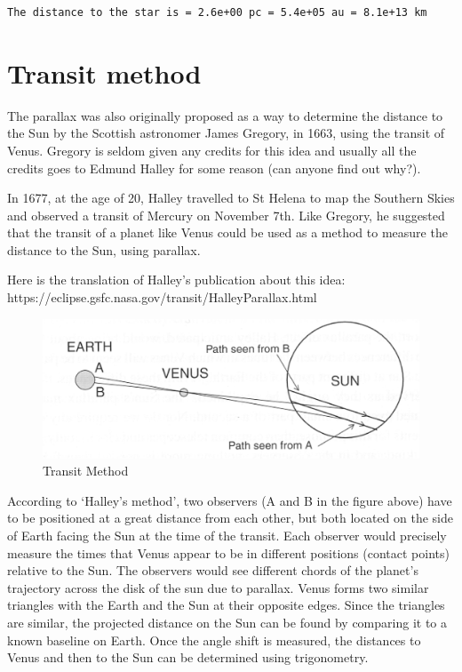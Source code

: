 \documentclass[
  letterpaper,
  DIV=11,
  numbers=noendperiod]{scrreprt}
\begin{document}
\begin{verbatim}
The distance to the star is = 2.6e+00 pc = 5.4e+05 au = 8.1e+13 km
\end{verbatim}

\hypertarget{transit-method}{%
\section{Transit method}\label{transit-method}}

The parallax was also originally proposed as a way to determine the
distance to the Sun by the Scottish astronomer James Gregory, in 1663,
using the transit of Venus. Gregory is seldom given any credits for this
idea and usually all the credits goes to Edmund Halley for some reason
(can anyone find out why?).

In 1677, at the age of 20, Halley travelled to St Helena to map the
Southern Skies and observed a transit of Mercury on November 7th. Like
Gregory, he suggested that the transit of a planet like Venus could be
used as a method to measure the distance to the Sun, using parallax.

Here is the translation of Halley's publication about this idea:
https://eclipse.gsfc.nasa.gov/transit/HalleyParallax.html

\begin{figure}

{\centering \includegraphics{img/TransitMethod.png}

}

\caption{Transit Method}

\end{figure}

According to `Halley's method', two observers (A and B in the figure
above) have to be positioned at a great distance from each other, but
both located on the side of Earth facing the Sun at the time of the
transit. Each observer would precisely measure the times that Venus
appear to be in different positions (contact points) relative to the
Sun. The observers would see different chords of the planet's trajectory
across the disk of the sun due to parallax. Venus forms two similar
triangles with the Earth and the Sun at their opposite edges. Since the
triangles are similar, the projected distance on the Sun can be found by
comparing it to a known baseline on Earth. Once the angle shift is
measured, the distances to Venus and then to the Sun can be determined
using trigonometry.
\end{document}
